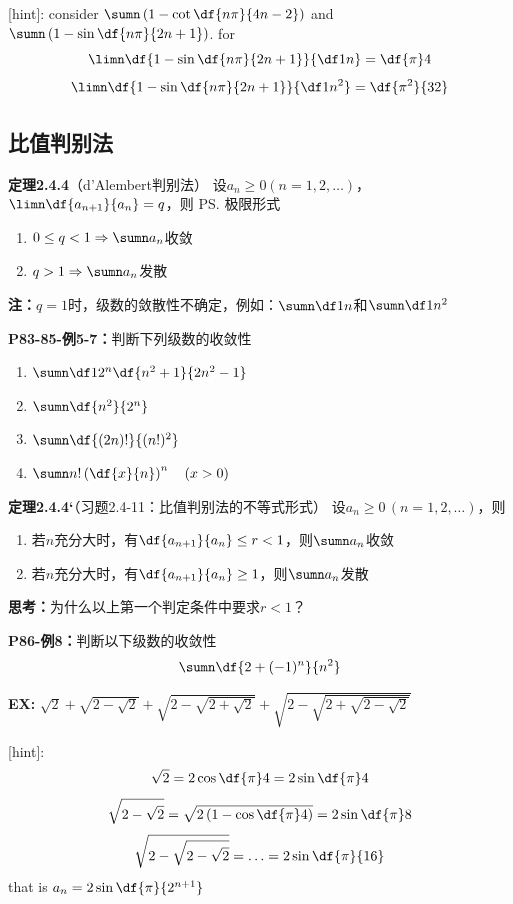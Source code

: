 [hint]: consider $\sumn\left(1-\cot\df{n\pi}{4n-2}\right)$ and
$\sumn\left(1-\sin\df{n\pi}{2n+1}\right)$. for
$$\limn\df{1-\sin\df{n\pi}{2n+1}}{\df1n}=\df{\pi}4$$
$$\limn\df{1-\sin\df{n\pi}{2n+1}}{\df1{n^2}}=\df{\pi^2}{32}$$

\subsection{比值判别法}

{\bf 定理2.4.4}（d'Alembert判别法）
设$a_n\geq 0(n=1,2,\ldots)$，$\limn\df{a_{n+1}}{a_n}=q$，则
\ps{极限形式} 
\begin{enumerate}
  \setlength{\itemindent}{1cm}
  \item $0\leq q<1\Rightarrow\sumn a_n$收敛 
  \item $q>1\Rightarrow\sumn a_n$发散
\end{enumerate}

{\bf 注：}$q=1$时，级数的敛散性不确定，例如：$\sumn\df 1n$和$\sumn\df 1{n^2}$

{\bf P83-85-例5-7：}判断下列级数的收敛性
\begin{enumerate} [(1)]
  \setlength{\itemindent}{1cm}
  \item $\sumn\df 1{2^n}\df{n^2+1}{2n^2-1}$ 
  \item $\sumn\df{n^2}{2^n}$ 
  \item $\sumn\df{(2n)!}{(n!)^2}$
  \item $\sumn n!\left(\df{x}{n}\right)^n\quad (x>0)$
\end{enumerate}

{\bf 定理2.4.4‘}（习题2.4-11：比值判别法的不等式形式）
设$a_n\geq 0\,(n=1,2,\ldots)$，则 
\begin{enumerate}
  \setlength{\itemindent}{1cm}
  \item 若$n$充分大时，有$\df{a_{n+1}}{a_n}\leq r<1$，则$\sumn a_n$收敛 
  \item 若$n$充分大时，有$\df{a_{n+1}}{a_n}\geq 1$，则$\sumn a_n$发散 
\end{enumerate}

{\bf 思考：}为什么以上第一个判定条件中要求$r<1$？

{\bf P86-例8：}判断以下级数的收敛性
$$\sumn\df{2+(-1)^n}{n^2}$$

{\bf EX:} $\sqrt2+\sqrt{2-\sqrt2}+\sqrt{2-\sqrt{2+\sqrt2}}
+\sqrt{2-\sqrt{2+\sqrt{2-\sqrt2}}}$

[hint]: 
$$\sqrt2=2\cos\df{\pi}4=2\sin\df{\pi}4$$
$$\sqrt{2-\sqrt2}=\sqrt{2\left(1-\cos\df{\pi}4\right)}=2\sin\df{\pi}8$$
$$\sqrt{2-\sqrt{2-\sqrt2}}=\ldots=2\sin\df{\pi}{16}$$
that is $a_n=2\sin\df{\pi}{2^{n+1}}$

